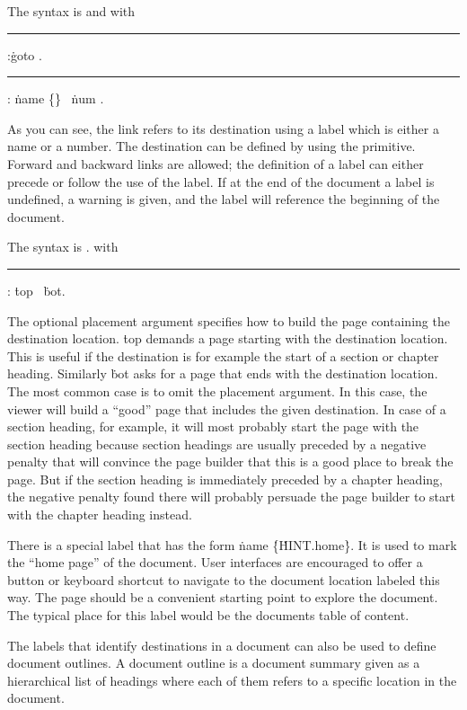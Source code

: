 The syntax is 
  
and
with

\medskip
\rule {}:\.{goto} .
\rule {}:
  \.{name} \.{\{}\.{\}} \OR\ \.{num} .
\medskip

As you can see, the link refers to its destination using a label
which is either a name or a number.
The destination can be defined by using the 
 primitive.
Forward and backward links are allowed; the definition of a label can either
precede or follow the use of the label. If at the end of the document a label
is undefined, a warning is given, and the label will reference the beginning of the
document.

The syntax is
\medskip
\prim{}  .
\medskip
with
\medskip
\rule{}:
\.{top} \OR\ \.{bot}.
\medskip

The optional placement argument specifies how to build the page 
containing the destination location. \.{top} demands
a page starting with the destination location. This is useful
if the destination is for example the start of a section or chapter heading.
Similarly \.{bot} asks for a page that ends with the destination location.
The most common case is to omit the placement argument. In this case, the
viewer will build a ``good'' page that includes the given destination.
In case of a section heading, for example, it will most probably start the
page with the section heading because section headings are usually preceded
by a negative penalty that will convince the page builder that this is a good
place to break the page. But if the section heading is immediately preceded
by a chapter heading, the negative penalty found there will probably
persuade the page builder to start with the chapter heading instead.

There is a special label that has the form
\.{name} \.{\{}\.{HINT.home}\.{\}}.
It is used to mark the ``home page'' of the document. User interfaces
are encouraged to offer a button or keyboard shortcut to navigate to the
document location labeled this way. The page should be a convenient
starting point to explore the document. The typical place for this label
would be the documents table of content.

The labels that identify destinations in a document can also be used
to define document outlines. A document outline is a document summary
given as a hierarchical list of headings where each of them
refers to a specific location in the document.

